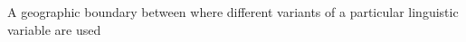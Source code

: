 A geographic boundary between where different variants of a particular linguistic variable are used
